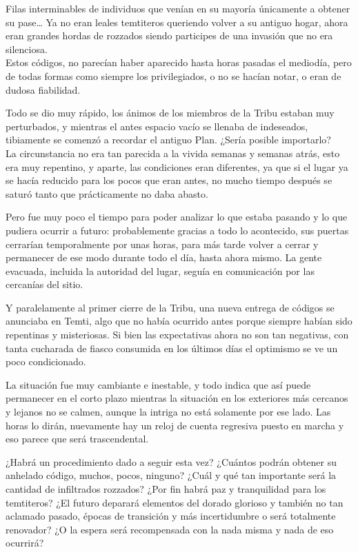 \documentclass[
  spanish,
]{book}
\begin{document}
Filas interminables de individuos que venían en su mayoría únicamente a obtener su pase\ldots{} Ya no eran leales temtiteros queriendo volver a su antiguo hogar, ahora eran grandes hordas de rozzados siendo participes de una invasión que no era silenciosa.\\
Estos códigos, no parecían haber aparecido hasta horas pasadas el mediodía, pero de todas formas como siempre los privilegiados, o no se hacían notar, o eran de dudosa fiabilidad.

Todo se dio muy rápido, los ánimos de los miembros de la Tribu estaban muy perturbados, y mientras el antes espacio vacío se llenaba de indeseados, tibiamente se comenzó a recordar el antiguo Plan. ¿Sería posible importarlo?\\
La circunstancia no era tan parecida a la vivida semanas y semanas atrás, esto era muy repentino, y aparte, las condiciones eran diferentes, ya que si el lugar ya se hacía reducido para los pocos que eran antes, no mucho tiempo después se saturó tanto que prácticamente no daba abasto.

Pero fue muy poco el tiempo para poder analizar lo que estaba pasando y lo que pudiera ocurrir a futuro: probablemente gracias a todo lo acontecido, sus puertas cerrarían temporalmente por unas horas, para más tarde volver a cerrar y permanecer de ese modo durante todo el día, hasta ahora mismo. La gente evacuada, incluida la autoridad del lugar, seguía en comunicación por las cercanías del sitio.

Y paralelamente al primer cierre de la Tribu, una nueva entrega de códigos se anunciaba en Temti, algo que no había ocurrido antes porque siempre habían sido repentinas y misteriosas. Si bien las expectativas ahora no son tan negativas, con tanta cucharada de fiasco consumida en los últimos días el optimismo se ve un poco condicionado.

La situación fue muy cambiante e inestable, y todo indica que así puede permanecer en el corto plazo mientras la situación en los exteriores más cercanos y lejanos no se calmen, aunque la intriga no está solamente por ese lado. Las horas lo dirán, nuevamente hay un reloj de cuenta regresiva puesto en marcha y eso parece que será trascendental.

¿Habrá un procedimiento dado a seguir esta vez? ¿Cuántos podrán obtener su anhelado código, muchos, pocos, ninguno? ¿Cuál y qué tan importante será la cantidad de infiltrados rozzados? ¿Por fin habrá paz y tranquilidad para los temtiteros? ¿El futuro deparará elementos del dorado glorioso y también no tan aclamado pasado, épocas de transición y más incertidumbre o será totalmente renovador? ¿O la espera será recompensada con la nada misma y nada de eso ocurrirá?
\end{document}
